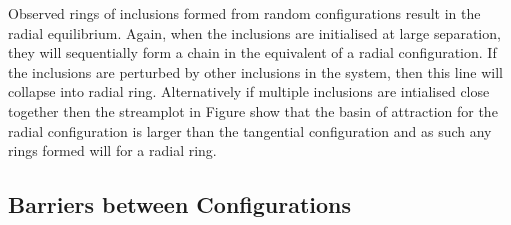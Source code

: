 Observed rings of inclusions formed from random configurations result in the radial equilibrium. Again, when the inclusions are initialised at large separation, they will sequentially form a chain in the equivalent of a radial configuration. If the inclusions are perturbed by other inclusions in the system, then this line will collapse into radial ring. Alternatively if multiple inclusions are intialised close together then the streamplot in Figure  show that the basin of attraction for the radial configuration is larger than the tangential configuration and as such any rings formed will for a radial ring.

\subsection{Barriers between Configurations}

